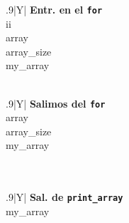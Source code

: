 \documentclass[a4paper]{article}
\begin{document}
\begin{table}[H]
    \begin{subfigure}{0.33333\linewidth}
        \centering
        \begin{tabularx}{.9\linewidth}{|Y|}
        \hline
        \textbf{Entr. en el \texttt{for}}\\\hline
        ii \\\hline
        array\\\hline
        array\_size\\\hline
        my\_array\\\hline
        \\ \hline
        \end{tabularx}
    \end{subfigure}%
    \begin{subfigure}{0.33333\linewidth}
        \centering
        \begin{tabularx}{.9\linewidth}{|Y|}
        \hline
        \textbf{Salimos del \texttt{for}}\\\hline
        array\\\hline
        array\_size\\\hline
        my\_array\\\hline
        \\ \hline
        \\ \hline
        \end{tabularx}
    \end{subfigure}%
    \begin{subfigure}{0.33333\linewidth}
        \centering
        \begin{tabularx}{.9\linewidth}{|Y|}
        \hline
        \textbf{Sal. de \texttt{print\_array}} \\\hline
        my\_array\\\hline
        \\ \hline
        \\ \hline
        \\ \hline
        \\ \hline
        \end{tabularx}
    \end{subfigure}%


\end{table}
\end{document}
